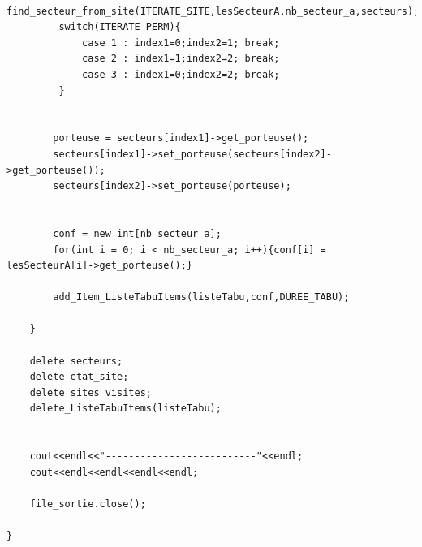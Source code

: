 \documentclass[a4paper, 11pt]{report}
\begin{document}
\begin{appendices}
\begin{lstlisting}
        find_secteur_from_site(ITERATE_SITE,lesSecteurA,nb_secteur_a,secteurs);
         switch(ITERATE_PERM){
             case 1 : index1=0;index2=1; break;
             case 2 : index1=1;index2=2; break;
             case 3 : index1=0;index2=2; break;
         }


        porteuse = secteurs[index1]->get_porteuse();
        secteurs[index1]->set_porteuse(secteurs[index2]->get_porteuse());
        secteurs[index2]->set_porteuse(porteuse);


        conf = new int[nb_secteur_a];
        for(int i = 0; i < nb_secteur_a; i++){conf[i] = lesSecteurA[i]->get_porteuse();}

        add_Item_ListeTabuItems(listeTabu,conf,DUREE_TABU);

    }

    delete secteurs;
    delete etat_site;
    delete sites_visites;
    delete_ListeTabuItems(listeTabu);


    cout<<endl<<"--------------------------"<<endl;
    cout<<endl<<endl<<endl<<endl;

    file_sortie.close();

}
\end{lstlisting}

\end{appendices}
\end{document}
